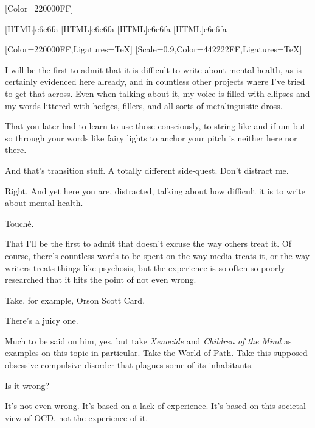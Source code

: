 \label{movement}
\renewfontfamily{}[Color=220000FF]

[HTML]{e6e6fa}
[HTML]{e6e6fa}
[HTML]{e6e6fa}
[HTML]{e6e6fa}
\begin{paracol}{2}
\begin{leftcolumn}

[Color=220000FF,Ligatures=TeX]
\renewfontfamily{}[Scale=0.9,Color=442222FF,Ligatures=TeX]

\noindent I will be the first to admit that it is difficult to write about mental health, as is certainly evidenced here already, and in countless other projects where I've tried to get that across. Even when talking about it, my voice is filled with ellipses and my words littered with hedges, fillers, and all sorts of metalinguistic dross.

\begin{ally}
That you later had to learn to use those consciously, to string like-and-if-um-but-so through your words like fairy lights to anchor your pitch is neither here nor there.
\end{ally}
And that's transition stuff. A totally different side-quest. Don't distract me.

\begin{ally}
Right. And yet here you are, distracted, talking about how difficult it is to write about mental health.
\end{ally}
Touché.

That I'll be the first to admit that doesn't excuse the way others treat it. Of course, there's countless words to be spent on the way media treats it, or the way writers treats things like psychosis, but the experience is so often so poorly researched that it hits the point of not even wrong.

Take, for example, Orson Scott Card.

\begin{ally}
There's a juicy one.
\end{ally}
Much to be said on him, yes, but take \emph{Xenocide} and \emph{Children of the Mind} as examples on this topic in particular. Take the World of Path. Take this supposed obsessive-compulsive disorder that plagues some of its inhabitants.
\newpage

\begin{ally}
Is it wrong?
\end{ally}
It's not even wrong. It's based on a lack of experience. It's based on this societal view of OCD, not the experience of it.


\end{leftcolumn}
\end{paracol}
